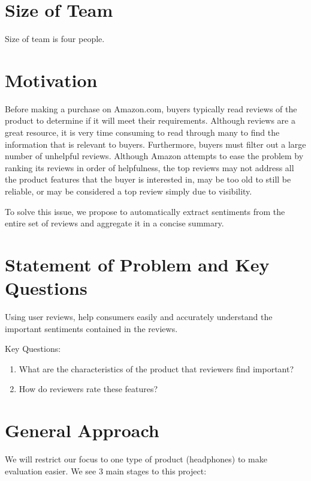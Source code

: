 \documentclass{article}
\begin{document}
 


\section{Size of Team}
Size of team is four people. 

\section{Motivation} 
 
Before making a purchase on Amazon.com, buyers typically read reviews of the product to determine if it will meet their requirements. Although reviews are a great resource, it is very time consuming to read through many to find the information that is relevant to buyers. Furthermore, buyers must filter out a large number of unhelpful reviews. Although Amazon attempts to ease the problem by ranking its reviews in order of helpfulness, the top reviews may not address all the product features that the buyer is interested in, may be too old to still be reliable, or may be considered a top review simply due to visibility. 

To solve this issue, we propose to automatically extract sentiments from the entire set of reviews and aggregate it in a concise summary.

\section{Statement of Problem and Key Questions} 

Using user reviews, help consumers easily and accurately understand the important sentiments contained in the reviews. 

Key Questions:

\begin{enumerate}
\item What are the characteristics of the product that reviewers find important?
\item How do reviewers rate these features?
\end{enumerate}

\section{General Approach}
We will restrict our focus to one type of product (headphones) to make evaluation easier. We see 3 main stages to this project:
\end{document}
